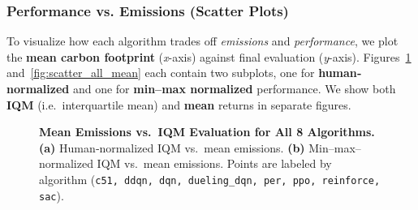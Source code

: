 \subsubsection{Performance vs. Emissions (Scatter Plots)}
To visualize how each algorithm trades off \emph{emissions} and \emph{performance},
we plot the \textbf{mean carbon footprint} (\textit{x}-axis) against final evaluation 
(\textit{y}-axis). Figures~\ref{fig:scatter_all_iqmean} and~\ref{fig:scatter_all_mean}
each contain two subplots, one for \textbf{human‐normalized} and one for 
\textbf{min--max normalized} performance. We show both \textbf{IQM} (i.e.\ interquartile mean) 
and \textbf{mean} returns in separate figures.

\begin{figure}[htbp]
	\centering
	\quad
	\caption{\textbf{Mean Emissions vs.\ IQM Evaluation for All 8 Algorithms.}
		\textbf{(a)} Human‐normalized IQM vs.\ mean emissions. 
		\textbf{(b)} Min--max–normalized IQM vs.\ mean emissions. 
		Points are labeled by algorithm (\texttt{c51, ddqn, dqn, dueling\_dqn, per, ppo, reinforce, sac}).}
	\label{fig:scatter_all_iqmean}
\end{figure}

